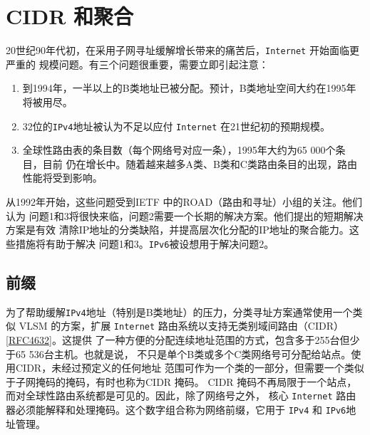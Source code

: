 \section{CIDR 和聚合}
20世纪90年代初，在采用子网寻址缓解增长带来的痛苦后，\verb|Internet| 开始面临更严重的
规模问题。有三个问题很重要，需要立即引起注意：

\begin{enumerate}
    \item 到1994年，一半以上的B类地址已被分配。预计，B类地址空间大约在1995年将被用尽。
    \item 32位的\verb|IPv4|地址被认为不足以应付 \verb|Internet| 在21世纪初的预期规模。
    \item 全球性路由表的条目数（每个网络号对应一条），1995年大约为65 000个条目，目前
    仍在增长中。随着越来越多A类、B类和C类路由条目的出现，路由性能将受到影响。
\end{enumerate}

从1992年开始，这些问题受到IETF 中的ROAD（路由和寻址）小组的关注。他们认为
问题1和3将很快来临，问题2需要一个长期的解决方案。他们提出的短期解决方案是有效
清除IP地址的分类缺陷，并提高层次化分配的IP地址的聚合能力。这些措施将有助于解决
问题1和3。\verb|IPv6|被设想用于解决问题2。

\subsection{前缀}
为了帮助缓解\verb|IPv4|地址（特别是B类地址）的压力，分类寻址方案通常使用一个类似
VLSM 的方案，扩展 \verb|Internet| 路由系统以支持无类别域间路由（CIDR）\href{https://www.rfc-editor.org/rfc/rfc4632}{[RFC4632]}。这提供
了一种方便的分配连续地址范围的方式，包含多于255台但少于65 536台主机。也就是说，
不只是单个B类或多个C类网络号可分配给站点。使用CIDR，未经过预定义的任何地址
范围可作为一个类的一部分，但需要一个类似于子网掩码的掩码，有时也称为CIDR 掩码。
CIDR 掩码不再局限于一个站点，而对全球性路由系统都是可见的。因此，除了网络号之外，
核心 \verb|Internet| 路由器必须能解释和处理掩码。这个数字组合称为网络前缀，它用于 \verb|IPv4| 和
\verb|IPv6|地址管理。

